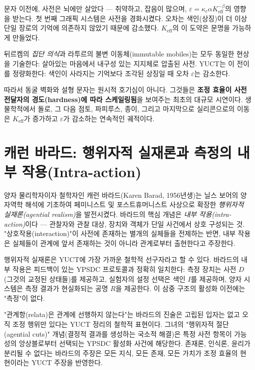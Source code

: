\documentclass[12pt,a4paper]{article}
\begin{document}
	문자 이전에, 사전은 뇌에만 살았다 — 취약하고, 잡음이 많으며, \(\varepsilon = \kappa_c \alpha K_{\mathrm{eff}}^{-\beta}\)의 영향을 받는다. 첫 번째 그래픽 시스템은 사전을 경화시켰다. 오차는 색인(상징)이 더 이상 단일 장로의 기억에 의존하지 않았기 때문에 감소했다. \(K_{\mathrm{eff}}\)의 이 도약은 문명을 가능하게 만들었다.
	
	뒤르켐의 \emph{집단 의식}과 라투르의 불변 이동체(immutable mobiles)는 모두 동일한 현상을 기술한다: 살아있는 마음에서 내구성 있는 지지체로 압출된 사전. YUCT는 이 전이를 정량화한다: 색인이 사라지는 기억보다 조각된 상징일 때 오차 \(\varepsilon\)는 감소한다.
	
	따라서 동굴 벽화와 설형 문자는 원시적 호기심이 아니다. 그것들은 \textbf{조정 효율이 사전 전달자의 경도(hardness)에 따라 스케일링됨}을 보여주는 최초의 대규모 시연이다. 생물학적에서 돌로, 그 다음 점토, 파피루스, 종이, 그리고 마지막으로 실리콘으로의 이동은 \(K_{\mathrm{eff}}\)가 증가하고 \(\varepsilon\)가 감소하는 연속적인 궤적이다.
	
	\section{캐런 바라드: 행위자적 실재론과 측정의 내부 작용(Intra-action)}
	
	양자 물리학자이자 철학자인 캐런 바라드(Karen Barad, 1956년생)는 닐스 보어의 양자역학 해석에 기초하여 페미니스트 및 포스트휴머니스트 사상으로 확장한 \emph{행위자적 실재론(agential realism)}을 발전시켰다. 바라드의 핵심 개념은 \emph{내부 작용(intra-action)}이다 — 관찰자와 관찰 대상, 장치와 객체가 단일 사건에서 상호 구성되는 것. "상호작용(interaction)"이 사전에 존재하는 별개의 실체들을 전제하는 반면, 내부 작용은 실체들이 관계에 앞서 존재하는 것이 아니라 관계로부터 출현한다고 주장한다.
	
	행위자적 실재론은 YUCT에 가장 가까운 철학적 선구자라고 할 수 있다. 바라드의 내부 작용은 피드백이 있는 YPSDC 프로토콜과 정확히 일치한다: 측정 장치는 사전 \(D\)(그것의 교정된 상태들)를 제공하고, 실험자의 설정 선택은 색인 \(I\)를 제공하며, 양자 시스템은 측정 결과가 현실화되는 공명 \(R\)을 제공한다. 이 삼중 구조의 활성화 이전에는 "측정"이 없다.
	
	"관계항(relata)은 관계에 선행하지 않는다"는 바라드의 진술은 고립된 입자는 없고 오직 조정 행위만 있다는 YUCT 정리의 철학적 표현이다. 그녀의 "행위자적 절단(agential cuts)" 개념(결정적 결과를 생성하는 국소적 해결)은 특정 사전 항목이 가능성의 앙상블로부터 선택되는 YPSDC 활성화 사건에 해당한다. 존재론, 인식론, 윤리가 분리될 수 없다는 바라드의 주장은 모든 지식, 모든 존재, 모든 가치가 조정 효율의 현현이라는 YUCT 주장을 반영한다.
	
\end{document}
